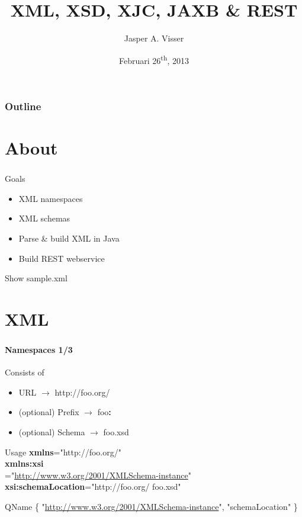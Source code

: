 \documentclass[handout]{beamer}
\title[XML]{XML, XSD, XJC, JAXB \& REST}
\author[Jasper A. Visser]{Jasper A. Visser}
\institute[Portavita]{Portavita BV}
\date{Februari 26\textsuperscript{th}, 2013}
\begin{document}
\begin{frame}
	\titlepage
\end{frame}

\begin{frame}
	\frametitle{Outline}
	\tableofcontents
\end{frame}

\section*{About}
\begin{frame}
	\frametitle{\insertsection}
	\begin{block}{Goals}
		\begin{itemize}
			\item XML namespaces
			\item XML schemas
			\item Parse \& build XML in Java
			\item Build REST webservice
		\end{itemize}
	\end{block}
	\begin{semiverbatim}
		Show sample.xml
	\end{semiverbatim}
\end{frame}

\section{XML}
\begin{frame}
	\frametitle{\insertsection}
	\framesubtitle{Namespaces 1/3}
	\begin{block}{Consists of}
		\begin{itemize}
			\item URL $\rightarrow$ http://foo.org/
			\item (optional) Prefix $\rightarrow$ foo\textbf{:}
			\item (optional) Schema $\rightarrow$ foo.xsd
		\end{itemize}
	\end{block}
	\begin{block}{Usage} \small
		\textbf{xmlns}="http://foo.org/" \\
		\textbf{xmlns:xsi}\\="\url{http://www.w3.org/2001/XMLSchema-instance}" \\
		\textbf{xsi:schemaLocation}="http://foo.org/ foo.xsd" \\
	\end{block}
	\begin{block}{QName} \small
		\{ "\url{http://www.w3.org/2001/XMLSchema-instance}", "schemaLocation" \} \\
	\end{block}
\end{frame}
\end{document}
